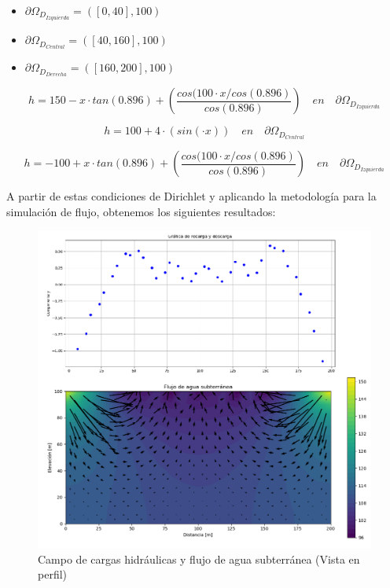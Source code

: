 \begin{itemize}
\item  ${\partial}\Omega_{D_{Izquierda}}={([0,40],100)}$
\item  ${\partial}\Omega_{D_{Central}}={([40,160],100)}$
\item  ${\partial}\Omega_{D_{Derecha}}={([160,200],100)}$ 
\end{itemize}

 \begin{equation}
 \label{eqn:mys11}
    h=150-x{\cdot}tan(0.896)+(\dfrac{cos(100{\cdot}x/cos(0.896) }{cos(0.896)}) \quad en \quad  {\partial}\Omega_{D_{Izquierda}}    
    \end{equation}

\begin{equation}
 \label{eqn:mys12}
    h= 100+4{\cdot}(sin({\cdot}x)) \quad  en \quad {\partial}\Omega_{D_{Central}}
\end{equation}

\begin{equation}
 \label{eqn:mys13}
    h= -100+x{\cdot}tan(0.896)+(\dfrac{cos(100{\cdot}x/cos(0.896) }{cos(0.896)}) \quad en \quad  {\partial}\Omega_{D_{Izquierda}}   
\end{equation}

A partir de estas condiciones de Dirichlet y aplicando la metodología para la simulación de flujo, obtenemos los siguientes resultados:

 \begin{figure}[H]
\centering
\includegraphics[scale=0.50]{Figura_29e.png}
\caption{ Campo de cargas hidráulicas y flujo de agua subterránea (Vista en perfil)}
\label{Figura20:2}
\end{figure}


